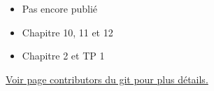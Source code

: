   \begin{itemize}
    \item Pas encore publié
  \end{itemize}
  \begin{itemize}
    \item Chapitre 10, 11 et 12
  \end{itemize}
  \begin{itemize}
    \item Chapitre 2 et TP 1
  \end{itemize}
\href{https://github.com/blegat/LINMA1691/graphs/contributors}{Voir page contributors du git pour plus détails.}

\clearpage
\printindex


